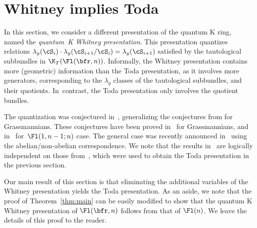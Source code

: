 \section{Whitney implies Toda}\label{sec:whitney}
In this section, we consider a different presentation of the quantum K ring, named the
{\em quantum~K Whitney presentation}.
This presentation quantizes
 relations $\lambda_y(\cS_i) \cdot \lambda_y(\cS_{i+1}/\cS_i) = \lambda_y(\cS_{i+1})$
 satisfied by the tautological subbundles in $\K_T(\Fl(\bfr,n))$. Informally, the
 Whitney presentation contains more (geometric) information than the Toda presentation,
 as it involves more generators, corresponding to the $\lambda_y$
 classes of the tautological subbundles, and their quotients. In~contrast, the Toda presentation
 only involves the quotient bundles.




The quantization was conjectured in~\cite{gu2023quantum,GMSXZZ:QKW},
generalizing the conjectures from
\cite{Gu:2020zpg} for Grassmannians. These conjectures have been proved in~\cite{gu2022quantum}
for Grassmannians, and in~\cite{GMSXZZ:QKW} for~$\Fl(1,n-1;n)$ case. The general case was recently announced in~\cite{huq2024quantum} using the abelian/non-abelian correspondence.
We note that the results in~\cite{huq2024quantum} are logically independent on those from~\cite{maeno2023presentation}, which were used to obtain the Toda presentation in the previous section.


Our main result of this section is that eliminating the additional variables of the Whitney presentation yields the Toda presentation. As an aside, we note that the proof of Theorem~\ref{thm:main} can be easily modified to show that the quantum K Whitney presentation of $\Fl(\bfr,n)$ follows from that of $\Fl(n)$.
We leave the details of this proof to the reader.

